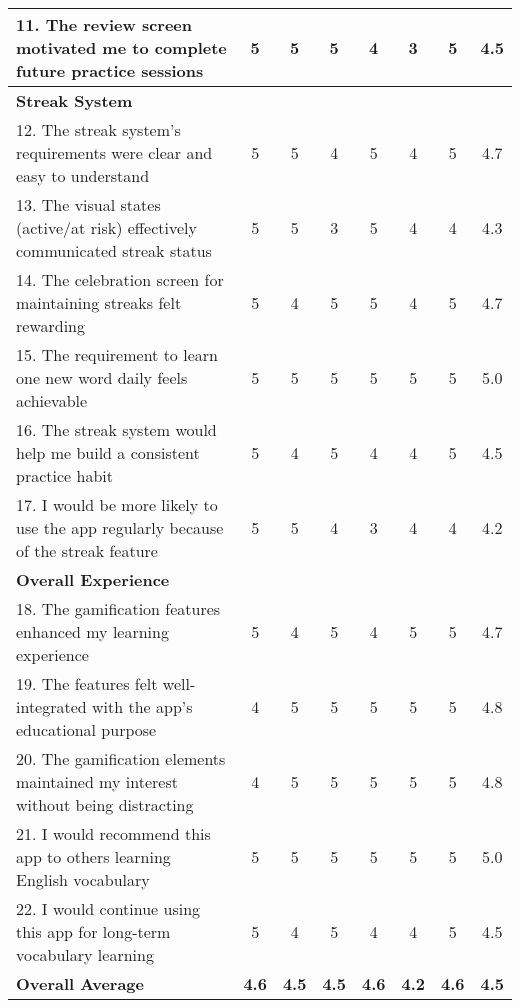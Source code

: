 \begin{table}[ht]
{\begin{tabular}{|p{}|c|c|c|c|c|c|c|}
            \hline
            11. The review screen motivated me to complete future practice sessions & 5 & 5 & 5 & 4 & 3 & 5 & 4.5 \\
            \hline
            \multicolumn{8}{|l|}{\textbf{Streak System}} \\
            \hline
            12. The streak system's requirements were clear and easy to understand & 5 & 5 & 4 & 5 & 4 & 5 & 4.7 \\
            \hline
            13. The visual states (active/at risk) effectively communicated streak status & 5 & 5 & 3 & 5 & 4 & 4 & 4.3 \\
            \hline
            14. The celebration screen for maintaining streaks felt rewarding & 5 & 4 & 5 & 5 & 4 & 5 & 4.7 \\
            \hline
            15. The requirement to learn one new word daily feels achievable & 5 & 5 & 5 & 5 & 5 & 5 & 5.0 \\
            \hline
            16. The streak system would help me build a consistent practice habit & 5 & 4 & 5 & 4 & 4 & 5 & 4.5 \\
            \hline
            17. I would be more likely to use the app regularly because of the streak feature & 5 & 5 & 4 & 3 & 4 & 4 & 4.2 \\
            \hline
            \multicolumn{8}{|l|}{\textbf{Overall Experience}} \\
            \hline
            18. The gamification features enhanced my learning experience & 5 & 4 & 5 & 4 & 5 & 5 & 4.7 \\
            \hline
            19. The features felt well-integrated with the app's educational purpose & 4 & 5 & 5 & 5 & 5 & 5 & 4.8 \\
            \hline
            20. The gamification elements maintained my interest without being distracting & 4 & 5 & 5 & 5 & 5 & 5 & 4.8 \\
            \hline
            21. I would recommend this app to others learning English vocabulary & 5 & 5 & 5 & 5 & 5 & 5 & 5.0 \\
            \hline
            22. I would continue using this app for long-term vocabulary learning & 5 & 4 & 5 & 4 & 4 & 5 & 4.5 \\
            \hline
            \hline
            \textbf{Overall Average} & \textbf{4.6} & \textbf{4.5} & \textbf{4.5} & \textbf{4.6} & \textbf{4.2} & \textbf{4.6} & \textbf{4.5} \\
            \hline
        \end{tabular}
    }
\end{table}